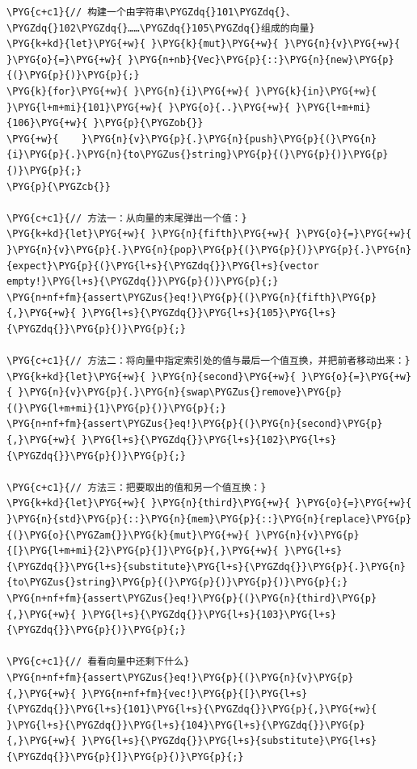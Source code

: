 \begin{Verbatim}[commandchars=\\\{\},breaklines=true,breakanywhere=true,fontsize=\codefont,xleftmargin=17bp]
\PYG{c+c1}{// 构建一个由字符串\PYGZdq{}101\PYGZdq{}、\PYGZdq{}102\PYGZdq{}……\PYGZdq{}105\PYGZdq{}组成的向量}
\PYG{k+kd}{let}\PYG{+w}{ }\PYG{k}{mut}\PYG{+w}{ }\PYG{n}{v}\PYG{+w}{ }\PYG{o}{=}\PYG{+w}{ }\PYG{n+nb}{Vec}\PYG{p}{::}\PYG{n}{new}\PYG{p}{(}\PYG{p}{)}\PYG{p}{;}
\PYG{k}{for}\PYG{+w}{ }\PYG{n}{i}\PYG{+w}{ }\PYG{k}{in}\PYG{+w}{ }\PYG{l+m+mi}{101}\PYG{+w}{ }\PYG{o}{..}\PYG{+w}{ }\PYG{l+m+mi}{106}\PYG{+w}{ }\PYG{p}{\PYGZob{}}
\PYG{+w}{    }\PYG{n}{v}\PYG{p}{.}\PYG{n}{push}\PYG{p}{(}\PYG{n}{i}\PYG{p}{.}\PYG{n}{to\PYGZus{}string}\PYG{p}{(}\PYG{p}{)}\PYG{p}{)}\PYG{p}{;}
\PYG{p}{\PYGZcb{}}

\PYG{c+c1}{// 方法一：从向量的末尾弹出一个值：}
\PYG{k+kd}{let}\PYG{+w}{ }\PYG{n}{fifth}\PYG{+w}{ }\PYG{o}{=}\PYG{+w}{ }\PYG{n}{v}\PYG{p}{.}\PYG{n}{pop}\PYG{p}{(}\PYG{p}{)}\PYG{p}{.}\PYG{n}{expect}\PYG{p}{(}\PYG{l+s}{\PYGZdq{}}\PYG{l+s}{vector empty!}\PYG{l+s}{\PYGZdq{}}\PYG{p}{)}\PYG{p}{;}
\PYG{n+nf+fm}{assert\PYGZus{}eq!}\PYG{p}{(}\PYG{n}{fifth}\PYG{p}{,}\PYG{+w}{ }\PYG{l+s}{\PYGZdq{}}\PYG{l+s}{105}\PYG{l+s}{\PYGZdq{}}\PYG{p}{)}\PYG{p}{;}

\PYG{c+c1}{// 方法二：将向量中指定索引处的值与最后一个值互换，并把前者移动出来：}
\PYG{k+kd}{let}\PYG{+w}{ }\PYG{n}{second}\PYG{+w}{ }\PYG{o}{=}\PYG{+w}{ }\PYG{n}{v}\PYG{p}{.}\PYG{n}{swap\PYGZus{}remove}\PYG{p}{(}\PYG{l+m+mi}{1}\PYG{p}{)}\PYG{p}{;}
\PYG{n+nf+fm}{assert\PYGZus{}eq!}\PYG{p}{(}\PYG{n}{second}\PYG{p}{,}\PYG{+w}{ }\PYG{l+s}{\PYGZdq{}}\PYG{l+s}{102}\PYG{l+s}{\PYGZdq{}}\PYG{p}{)}\PYG{p}{;}

\PYG{c+c1}{// 方法三：把要取出的值和另一个值互换：}
\PYG{k+kd}{let}\PYG{+w}{ }\PYG{n}{third}\PYG{+w}{ }\PYG{o}{=}\PYG{+w}{ }\PYG{n}{std}\PYG{p}{::}\PYG{n}{mem}\PYG{p}{::}\PYG{n}{replace}\PYG{p}{(}\PYG{o}{\PYGZam{}}\PYG{k}{mut}\PYG{+w}{ }\PYG{n}{v}\PYG{p}{[}\PYG{l+m+mi}{2}\PYG{p}{]}\PYG{p}{,}\PYG{+w}{ }\PYG{l+s}{\PYGZdq{}}\PYG{l+s}{substitute}\PYG{l+s}{\PYGZdq{}}\PYG{p}{.}\PYG{n}{to\PYGZus{}string}\PYG{p}{(}\PYG{p}{)}\PYG{p}{)}\PYG{p}{;}
\PYG{n+nf+fm}{assert\PYGZus{}eq!}\PYG{p}{(}\PYG{n}{third}\PYG{p}{,}\PYG{+w}{ }\PYG{l+s}{\PYGZdq{}}\PYG{l+s}{103}\PYG{l+s}{\PYGZdq{}}\PYG{p}{)}\PYG{p}{;}

\PYG{c+c1}{// 看看向量中还剩下什么}
\PYG{n+nf+fm}{assert\PYGZus{}eq!}\PYG{p}{(}\PYG{n}{v}\PYG{p}{,}\PYG{+w}{ }\PYG{n+nf+fm}{vec!}\PYG{p}{[}\PYG{l+s}{\PYGZdq{}}\PYG{l+s}{101}\PYG{l+s}{\PYGZdq{}}\PYG{p}{,}\PYG{+w}{ }\PYG{l+s}{\PYGZdq{}}\PYG{l+s}{104}\PYG{l+s}{\PYGZdq{}}\PYG{p}{,}\PYG{+w}{ }\PYG{l+s}{\PYGZdq{}}\PYG{l+s}{substitute}\PYG{l+s}{\PYGZdq{}}\PYG{p}{]}\PYG{p}{)}\PYG{p}{;}
\end{Verbatim}


